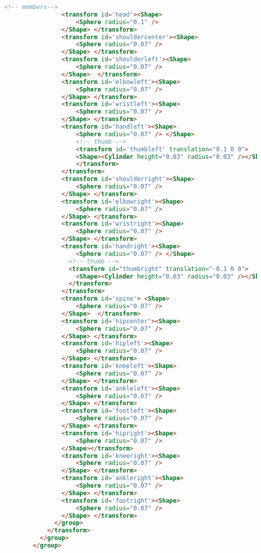 \begin{lstlisting}[language=Html]
                <!-- members-->
                <transform id='head'><Shape>
                	<Sphere radius="0.1" /> 
                </Shape> </transform>
                <transform id='shouldercenter'><Shape>
                	<Sphere radius="0.07" />
                </Shape> </transform>
                <transform id='shoulderleft'><Shape>
                	<Sphere radius="0.07" />
                </Shape>  </transform>
                <transform id='elbowleft'><Shape>
                	<Sphere radius="0.07" />
                </Shape> </transform>
                <transform id='wristleft'><Shape>
                	<Sphere radius="0.07" />
                </Shape> </transform>
                <transform id='handleft'><Shape>
                	<Sphere radius="0.07" /> </Shape> 
               		<!-- thumb -->
                  	<transform id='thumbleft' translation="0.1 0 0">
                  	<Shape><Cylinder height="0.03" radius="0.03" /></Shape>
                  	</transform>              
                </transform>
                <transform id='shoulderright'><Shape>
                	<Sphere radius="0.07" />
                </Shape> </transform>
                <transform id='elbowright'><Shape>
                	<Sphere radius="0.07" />
                </Shape> </transform>
                <transform id='wristright'><Shape>
                	<Sphere radius="0.07" />
                </Shape> </transform>
                <transform id='handright'><Shape>
                	<Sphere radius="0.07" /> </Shape> 
                  <!-- thumb -->
                  <transform id="thumbright" translation="-0.1 0 0">
                  	<Shape><Cylinder height="0.03" radius="0.03" /></Shape>
                  </transform>   
                </transform>
                <transform id='spine'> <Shape>
                	<Sphere radius="0.07" />
                </Shape>  </transform>
                <transform id='hipcenter'><Shape>
                	<Sphere radius="0.07" />
                </Shape> </transform>
                <transform id='hipleft'><Shape>
                	<Sphere radius="0.07" />
                </Shape> </transform>
                <transform id='kneeleft'><Shape>
                	<Sphere radius="0.07" />
                </Shape> </transform>
                <transform id='ankleleft'><Shape>
                	<Sphere radius="0.07" />
                </Shape> </transform>
                <transform id='footleft'><Shape>
                	<Sphere radius="0.07" />
                </Shape> </transform>
                <transform id='hipright'><Shape>
                	<Sphere radius="0.07" />
                </Shape></transform>
                <transform id='kneeright'><Shape>
                	<Sphere radius="0.07" />
                </Shape> </transform>
                <transform id='ankleright'><Shape>
                	<Sphere radius="0.07" />
                </Shape> </transform>
                <transform id='footright'><Shape>
                	<Sphere radius="0.07" />
                </Shape> </transform>
              </group>
            </transform>
          </group>
        </group>
          

\end{lstlisting}
